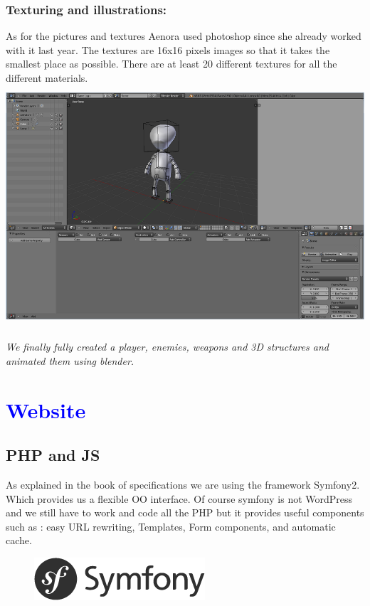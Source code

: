 \documentclass[article]{report} %
\begin{document}
 \subsection{Texturing and illustrations:}
	As for the pictures and textures Aenora used photoshop since she already worked with it last year. The textures are 16x16 pixels images so that it takes the smallest place as possible. There are at least 20 different textures for all the different materials.\\

				\includegraphics[width=15cm, height=9cm]{images/Graphics/game_engine.png}
				\begin{center}\it We finally fully created a player, enemies, weapons and 3D structures and animated them using blender. 							\end{center}

\chapter{\textcolor{blue}{Website}}
				\section{PHP and JS}
					As explained in the book of specifications we are using the framework Symfony2. Which provides us a flexible OO interface. Of course symfony is not WordPress and we still have to work and code all the PHP but it provides useful components such as : easy URL rewriting, Templates, Form components, and automatic cache. \\
				\begin{figure}[h]
					\includegraphics[scale=1.25]{images/Others/logo_symfony.png}
				\end{figure}
\\
\end{document}
